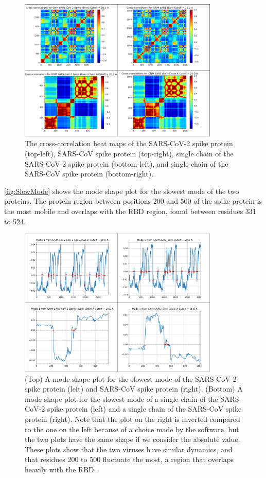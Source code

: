 \begin{figure}[h]
	\centering
	\mySfFamily
	\includegraphics[width = 0.85\textwidth]{../images/CrossCorr.png}
	\caption{The cross-correlation heat maps of the SARS-CoV-2 spike protein (top-left), SARS-CoV spike protein (top-right), single chain of the SARS-CoV-2 spike protein (bottom-left), and single-chain of the SARS-CoV spike protein (bottom-right).}
	\label{fig:CrossCorr}
\end{figure}

\autoref{fig:SlowMode} shows the mode shape plot for the slowest mode of the two proteins. The protein region between positions 200 and 500 of the spike protein is the most mobile and overlaps with the RBD region, found between residues 331 to 524.\\

\begin{figure}[h]
	\centering
	\mySfFamily
	\includegraphics[width = 0.85\textwidth]{../images/SlowMode.png}
	\caption{(Top) A mode shape plot for the slowest mode of the SARS-CoV-2 spike protein (left) and SARS-CoV spike protein (right). (Bottom) A mode shape plot for the slowest mode of a single chain of the SARS-CoV-2 spike protein (left) and a single chain of the SARS-CoV spike protein (right). Note that the plot on the right is inverted compared to the one on the left because of a choice made by the software, but the two plots have the same shape if we consider the absolute value. These plots show that the two viruses have similar dynamics, and that residues 200 to 500 fluctuate the most, a region that overlaps heavily with the RBD.}
	\label{fig:SlowMode}
\end{figure}

